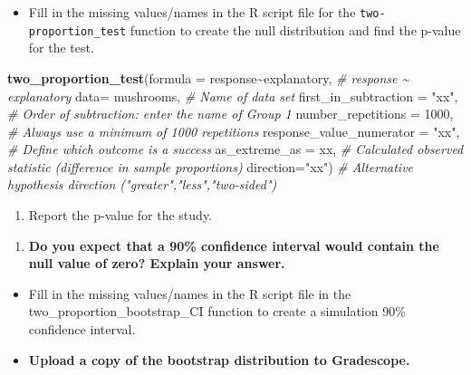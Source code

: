 \documentclass[
]{report}
\newenvironment{Shaded}{\begin{snugshade}}{\end{snugshade}}
\newcommand{\AttributeTok}[1]{\textcolor[rgb]{0.13,0.29,0.53}{#1}}
\newcommand{\CommentTok}[1]{\textcolor[rgb]{0.56,0.35,0.01}{\textit{#1}}}
\newcommand{\DecValTok}[1]{\textcolor[rgb]{0.00,0.00,0.81}{#1}}
\newcommand{\FunctionTok}[1]{\textcolor[rgb]{0.13,0.29,0.53}{\textbf{#1}}}
\newcommand{\NormalTok}[1]{#1}
\newcommand{\SpecialCharTok}[1]{\textcolor[rgb]{0.81,0.36,0.00}{\textbf{#1}}}
\newcommand{\StringTok}[1]{\textcolor[rgb]{0.31,0.60,0.02}{#1}}
\providecommand{\tightlist}{%
  \setlength{\itemsep}{0pt}\setlength{\parskip}{0pt}}
\begin{document}
\begin{itemize}
\tightlist
\item
  Fill in the missing values/names in the R script file for the \texttt{two-proportion\_test} function to create the null distribution and find the p-value for the test.
\end{itemize}

\begin{Shaded}
\begin{Highlighting}[]
\FunctionTok{two\_proportion\_test}\NormalTok{(}\AttributeTok{formula =}\NormalTok{ response}\SpecialCharTok{\textasciitilde{}}\NormalTok{explanatory, }\CommentTok{\# response \textasciitilde{} explanatory}
    \AttributeTok{data=}\NormalTok{ mushrooms, }\CommentTok{\# Name of data set}
    \AttributeTok{first\_in\_subtraction =} \StringTok{"xx"}\NormalTok{, }\CommentTok{\# Order of subtraction: enter the name of Group 1}
    \AttributeTok{number\_repetitions =} \DecValTok{1000}\NormalTok{, }\CommentTok{\# Always use a minimum of 1000 repetitions}
    \AttributeTok{response\_value\_numerator =} \StringTok{"xx"}\NormalTok{, }\CommentTok{\# Define which outcome is a success }
    \AttributeTok{as\_extreme\_as =}\NormalTok{ xx, }\CommentTok{\# Calculated observed statistic (difference in sample proportions)}
    \AttributeTok{direction=}\StringTok{"xx"}\NormalTok{) }\CommentTok{\# Alternative hypothesis direction ("greater","less","two{-}sided")}
\end{Highlighting}
\end{Shaded}

\begin{enumerate}
\def\labelenumi{\arabic{enumi}.}
\setcounter{enumi}{7}
\tightlist
\item
  Report the p-value for the study.
\end{enumerate}

\vspace{0.2in}

\begin{enumerate}
\def\labelenumi{\arabic{enumi}.}
\setcounter{enumi}{8}
\tightlist
\item
  \textbf{Do you expect that a 90\% confidence interval would contain the null value of zero? Explain your answer.}
\end{enumerate}

\vspace{0.8in}

\newpage

\begin{itemize}
\item
  Fill in the missing values/names in the R script file in the two\_proportion\_bootstrap\_CI function to create a simulation 90\% confidence interval.
\item
  \textbf{Upload a copy of the bootstrap distribution to Gradescope.}
\end{itemize}
\end{document}
